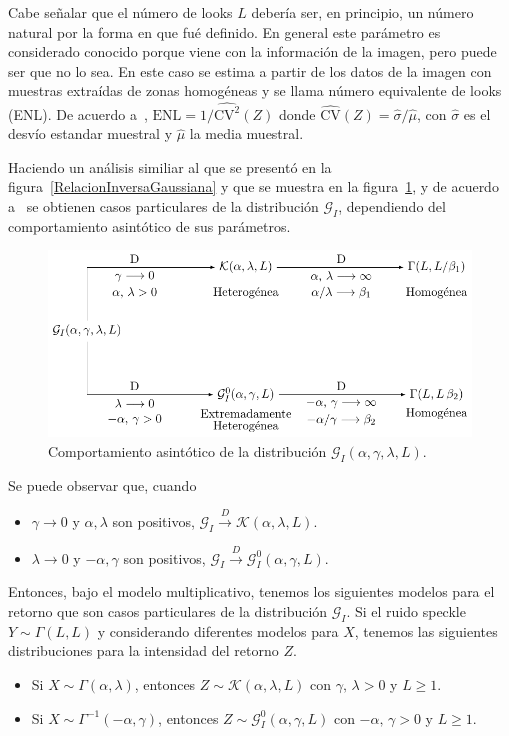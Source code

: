 Cabe señalar que el número de looks $L$ debería ser, en principio, un número natural por la forma en que fué definido. En general este parámetro es considerado conocido porque viene con la información de la imagen, pero puede ser que no lo sea. En este caso se estima a partir de los datos de la imagen con muestras extraídas de zonas homogéneas y se llama número equivalente de looks (ENL). De acuerdo a~\cite{anfinsen2009}, $\text{ENL}={1}/{\widehat{\text{CV}^2}(Z)}$ donde $\widehat{\text{CV}}(Z)={\widehat{\sigma}}/{\widehat\mu}$, con $\widehat{\sigma}$ es el desvío estandar muestral y $\widehat\mu$ la media muestral.

Haciendo un análisis similiar al que se presentó en la figura~\ref{RelacionInversaGaussiana} y que se muestra en la figura~\ref{RelacionGI}, y de acuerdo a~\cite{Frery99} se obtienen casos particulares de la distribución $\mathcal{G}_I$, dependiendo del comportamiento asintótico de sus parámetros.
\begin{figure}[hbt]
	\centering    
	\includegraphics[scale=1]{../../Figures/Tesis/Capitulo4/RelacionGI.pdf}
	\caption{\label{RelacionGI}Comportamiento asintótico de la distribución $\mathcal{G}_I(\alpha,\gamma,\lambda,L)$.} %
\end{figure} 

Se puede observar que, cuando 
\begin{itemize}
	\item $\gamma \longrightarrow 0$ y $\alpha,\lambda$ son positivos, $\mathcal{G}_I \stackrel{D}{\longrightarrow}\mathcal{K}(\alpha,\lambda,L)$.
	\item $\lambda \longrightarrow 0$ y $-\alpha,\gamma$ son positivos, $\mathcal{G}_I\stackrel{D}{\longrightarrow}\mathcal{G}_I^0(\alpha,\gamma,L)$.
\end{itemize}

Entonces, bajo el modelo multiplicativo, tenemos los siguientes modelos para el retorno que son casos particulares de la distribución $\mathcal{G}_I$. Si el ruido speckle $Y \sim \Gamma(L,L)$ y considerando diferentes modelos para $X$, tenemos las siguientes distribuciones para la intensidad del retorno $Z$.
\begin{itemize}
	\item Si $X \sim \Gamma(\alpha,\lambda)$, entonces $Z \sim \mathcal{K}(\alpha,\lambda,L)$ con $\gamma, \, \lambda >0$ y $L \geq 1$.
	\item Si $X \sim \Gamma^{-1}(-\alpha,\gamma)$, entonces $Z \sim \mathcal{G}_I^0(\alpha,\gamma,L)$ con $-\alpha, \, \gamma >0$ y $L \geq 1$.
\end{itemize}

